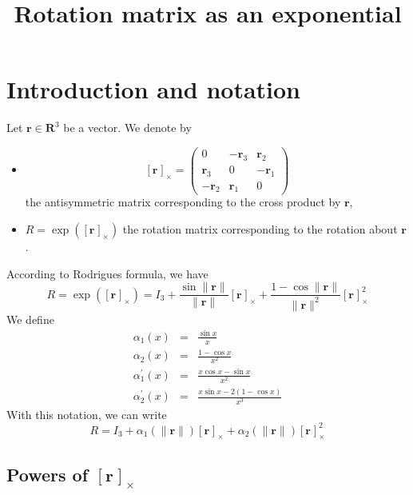\documentclass {article}
\title {Rotation matrix as an exponential}
\newcommand\reals{\mathbf{R}}
\newcommand\rot{\mathbf{r}}
\newcommand\rcross[1]{[\rot_{#1}]_{\times}}
\newcommand\normr{\|\rot\|}
\newcommand\alphap{\alpha^{\prime}}
\begin{document}
\maketitle

\section {Introduction and notation}

Let $\rot\in\reals^3$ be a vector. We denote by
\begin{itemize}
\item $$
\rcross{} = \left(\begin{array}{ccc}
0 & -\rot_3 & \rot_2 \\
\rot_3 & 0 & -\rot_1 \\
-\rot_2 & \rot_1 & 0
\end{array}\right)
$$
the antisymmetric matrix corresponding to the cross product by $\rot$,
\item $R = \exp (\rcross{})$ the rotation matrix corresponding to the rotation about
$\rot$.
\end{itemize}
According to Rodrigues formula, we have
\begin{equation}\label{eq:rodrigues}
R = \exp (\rcross{}) = I_3 + \frac{\sin \normr}{\normr}\rcross{} +
\frac{1 - \cos \normr}{\normr^2}\rcross{}^2
\end{equation}
We define
\begin{eqnarray}
\label{eq:alpha1}
\alpha_1 (x) &=& \frac{\sin x}{x}\\
\label{eq:alpha2}
\alpha_2 (x) &=& \frac{1 - \cos x}{x^2}\\
\label{eq:alpha3}
\alphap_1 (x) &=& \frac{x \cos x - \sin x}{x^2}\\
\label{eq:alpha4}
\alphap_2 (x) &=& \frac{x \sin x -2(1-\cos x)}{x^3}
\end{eqnarray}
With this notation, we can write
\begin{equation}\label{eq:rodrigues2}
R = I_3 + \alpha_1 (\normr) \rcross{} + \alpha_2 (\normr) \rcross{}^2
\end{equation}
\subsection {Powers of $\rcross{}$}
\end{document}
